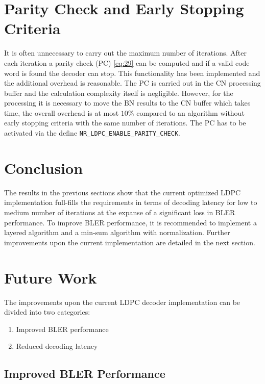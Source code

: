 \documentclass{article}
\begin{document}
\section{Parity Check and Early Stopping Criteria}
It is often unnecessary to carry out the maximum number of iterations. After each iteration a parity check (PC) \eqref{eq:29} can be computed and if a valid code word is found the decoder can stop. This functionality has been implemented and the additional overhead is reasonable. The PC is carried out in the CN processing buffer and the calculation complexity itself is negligible. However, for the processing it is necessary to move the BN results to the CN buffer which takes time, the overall overhead is at most $10\%$ compared to an algorithm without early stopping criteria with the same number of iterations. The PC has to be activated via the define \texttt{NR\_LDPC\_ENABLE\_PARITY\_CHECK}.


\section{Conclusion}
\label{sec:conclusion}

The results in the previous sections show that the current optimized LDPC implementation full-fills the requirements in terms of decoding latency for low to medium number of iterations at the expanse of a significant loss in BLER performance. To improve BLER performance, it is recommended to implement a layered algorithm and a min-sum algorithm with normalization. Further improvements upon the current implementation are detailed in the next section.

\newpage
\section{Future Work}
\label{sec:future-work}

The improvements upon the current LDPC decoder implementation can be divided into two categories:
\begin{enumerate}
\item Improved BLER performance
\item Reduced decoding latency
\end{enumerate}

\subsection{Improved BLER Performance}
\label{sec:impr-bler-perf}
\end{document}
